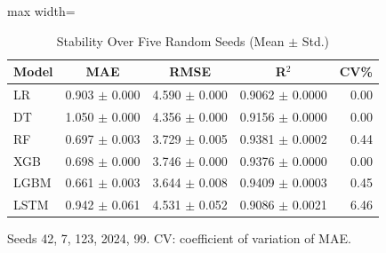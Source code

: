 \begin{table}[!htb]
\centering
\caption{Stability Over Five Random Seeds (Mean $\pm$ Std.)}
\label{tab:stability}
\footnotesize
\setlength{\tabcolsep}{4pt}
\begin{adjustbox}{max width=\columnwidth}
\begin{tabular}{lcccr}
\toprule
Model & MAE & RMSE & R$^2$ & CV\% \\
\midrule
LR & 0.903 $\pm$ 0.000 & 4.590 $\pm$ 0.000 & 0.9062 $\pm$ 0.0000 & 0.00 \\
DT & 1.050 $\pm$ 0.000 & 4.356 $\pm$ 0.000 & 0.9156 $\pm$ 0.0000 & 0.00 \\
RF & 0.697 $\pm$ 0.003 & 3.729 $\pm$ 0.005 & 0.9381 $\pm$ 0.0002 & 0.44 \\
XGB & 0.698 $\pm$ 0.000 & 3.746 $\pm$ 0.000 & 0.9376 $\pm$ 0.0000 & 0.00 \\
LGBM & 0.661 $\pm$ 0.003 & 3.644 $\pm$ 0.008 & 0.9409 $\pm$ 0.0003 & 0.45 \\
LSTM & 0.942 $\pm$ 0.061 & 4.531 $\pm$ 0.052 & 0.9086 $\pm$ 0.0021 & 6.46 \\
\bottomrule
\end{tabular}
\end{adjustbox}
\par\vspace{3pt}
{\scriptsize Seeds 42, 7, 123, 2024, 99. CV: coefficient of variation of MAE.\par}
\end{table}
